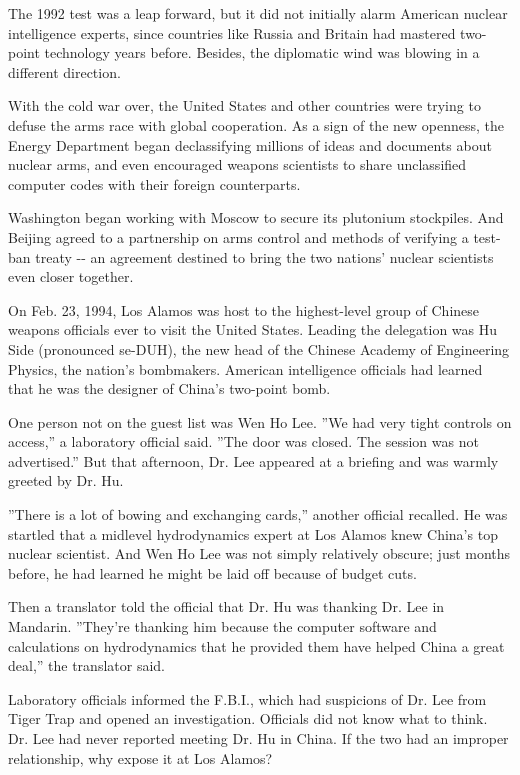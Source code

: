 The 1992 test was a leap forward, but it did not initially alarm
American nuclear intelligence experts, since countries like Russia and
Britain had mastered two-point technology years before. Besides, the
diplomatic wind was blowing in a different direction.

With the cold war over, the United States and other countries were
trying to defuse the arms race with global cooperation. As a sign of the
new openness, the Energy Department began declassifying millions of
ideas and documents about nuclear arms, and even encouraged weapons
scientists to share unclassified computer codes with their foreign
counterparts.

Washington began working with Moscow to secure its plutonium stockpiles.
And Beijing agreed to a partnership on arms control and methods of
verifying a test-ban treaty -\/- an agreement destined to bring the two
nations' nuclear scientists even closer together.

On Feb. 23, 1994, Los Alamos was host to the highest-level group of
Chinese weapons officials ever to visit the United States. Leading the
delegation was Hu Side (pronounced se-DUH), the new head of the Chinese
Academy of Engineering Physics, the nation's bombmakers. American
intelligence officials had learned that he was the designer of China's
two-point bomb.

One person not on the guest list was Wen Ho Lee. ''We had very tight
controls on access,'' a laboratory official said. ''The door was closed.
The session was not advertised.'' But that afternoon, Dr. Lee appeared
at a briefing and was warmly greeted by Dr. Hu.

''There is a lot of bowing and exchanging cards,'' another official
recalled. He was startled that a midlevel hydrodynamics expert at Los
Alamos knew China's top nuclear scientist. And Wen Ho Lee was not simply
relatively obscure; just months before, he had learned he might be laid
off because of budget cuts.

Then a translator told the official that Dr. Hu was thanking Dr. Lee in
Mandarin. ''They're thanking him because the computer software and
calculations on hydrodynamics that he provided them have helped China a
great deal,'' the translator said.

Laboratory officials informed the F.B.I., which had suspicions of Dr.
Lee from Tiger Trap and opened an investigation. Officials did not know
what to think. Dr. Lee had never reported meeting Dr. Hu in China. If
the two had an improper relationship, why expose it at Los Alamos?

